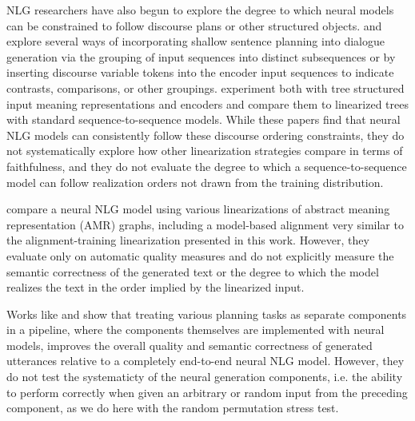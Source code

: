 NLG researchers have also begun to explore the degree to which
neural models can be constrained to follow discourse plans or other 
structured objects.
\citet{nayak2017} and \citet{reed2018} explore several ways of incorporating
shallow sentence planning into dialogue generation via the  grouping of input 
sequences into distinct subsequences or by inserting discourse variable 
tokens into the encoder input sequences to 
indicate contrasts, comparisons, or other groupings. 
\citet{balakrishnan2019} experiment
both with tree structured input meaning representations  and encoders and compare them to linearized trees with standard sequence-to-sequence models. 
While these papers find that neural NLG models can consistently follow these
discourse ordering constraints,
%
they do not  systematically explore how other linearization
strategies compare in terms of faithfulness, and they do not evaluate the
degree to which a sequence-to-sequence model can follow realization orders 
not drawn from the training distribution.

\citet{castroferreira2017} compare a neural NLG model using various
linearizations of abstract meaning representation (AMR) graphs, including a
model-based alignment very similar to the alignment-training 
linearization presented
in this work. However, they evaluate only on automatic quality measures and do
not explicitly measure the semantic correctness of the generated text or the
degree to which the model realizes the text in the order implied by the
linearized input.

Works like \citet{moryossef2019a,moryossef2019b} and
\citet{castroferreira2019} show that treating various planning tasks as
separate components in a pipeline, where the components themselves are
implemented with neural models, improves the overall quality and semantic
correctness of generated utterances relative to a completely end-to-end neural
NLG model. However, they do not test the systematicty of the neural generation
components, i.e. the ability to perform correctly when given an arbitrary or
random input from the preceding component, as we do here with the random
permutation stress test.%

